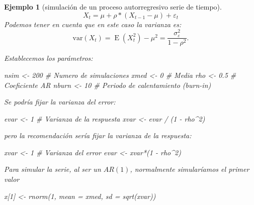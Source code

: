 \documentclass[
]{book}
\newenvironment{Shaded}{\begin{snugshade}}{\end{snugshade}}
\newcommand{\AttributeTok}[1]{\textcolor[rgb]{0.77,0.63,0.00}{#1}}
\newcommand{\CommentTok}[1]{\textcolor[rgb]{0.56,0.35,0.01}{\textit{#1}}}
\newcommand{\DecValTok}[1]{\textcolor[rgb]{0.00,0.00,0.81}{#1}}
\newcommand{\FloatTok}[1]{\textcolor[rgb]{0.00,0.00,0.81}{#1}}
\newcommand{\FunctionTok}[1]{\textcolor[rgb]{0.00,0.00,0.00}{#1}}
\newcommand{\NormalTok}[1]{#1}
\newcommand{\OtherTok}[1]{\textcolor[rgb]{0.56,0.35,0.01}{#1}}
\newcommand{\SpecialCharTok}[1]{\textcolor[rgb]{0.00,0.00,0.00}{#1}}
\theoremstyle{break}
\newtheorem{example}{Ejemplo}[chapter]
\theoremstyle{nonumberplain}
\begin{document}
\begin{example}[simulación de un proceso autorregresivo serie de tiempo]

\[X_t = \mu + \rho * (X_{t-1} - \mu) + \varepsilon_t\]
Podemos tener en cuenta que en este caso la varianza es:
\[\textrm{var}(X_t)=\operatorname{E}(X_t^2)-\mu^2=\frac{\sigma_\varepsilon^2}{1-\rho^2}.\]

Establecemos los parámetros:

\begin{Shaded}
\begin{Highlighting}[]
\NormalTok{nsim }\OtherTok{\textless{}{-}} \DecValTok{200}   \CommentTok{\# Numero de simulaciones}
\NormalTok{xmed }\OtherTok{\textless{}{-}} \DecValTok{0}     \CommentTok{\# Media}
\NormalTok{rho }\OtherTok{\textless{}{-}} \FloatTok{0.5}    \CommentTok{\# Coeficiente AR}
\NormalTok{nburn }\OtherTok{\textless{}{-}} \DecValTok{10}   \CommentTok{\# Periodo de calentamiento (burn{-}in)}
\end{Highlighting}
\end{Shaded}

Se podría fijar la varianza del error:

\begin{Shaded}
\begin{Highlighting}[]
\NormalTok{evar }\OtherTok{\textless{}{-}} \DecValTok{1}
\CommentTok{\# Varianza de la respuesta}
\NormalTok{xvar }\OtherTok{\textless{}{-}}\NormalTok{ evar }\SpecialCharTok{/}\NormalTok{ (}\DecValTok{1} \SpecialCharTok{{-}}\NormalTok{ rho}\SpecialCharTok{\^{}}\DecValTok{2}\NormalTok{)}
\end{Highlighting}
\end{Shaded}

pero la recomendación sería fijar la varianza de la respuesta:

\begin{Shaded}
\begin{Highlighting}[]
\NormalTok{xvar }\OtherTok{\textless{}{-}} \DecValTok{1}     
\CommentTok{\# Varianza del error}
\NormalTok{evar }\OtherTok{\textless{}{-}}\NormalTok{ xvar}\SpecialCharTok{*}\NormalTok{(}\DecValTok{1} \SpecialCharTok{{-}}\NormalTok{ rho}\SpecialCharTok{\^{}}\DecValTok{2}\NormalTok{)}
\end{Highlighting}
\end{Shaded}

Para simular la serie, al ser un \(AR(1)\), normalmente simularíamos el primer valor

\begin{Shaded}
\begin{Highlighting}[]
\NormalTok{x[}\DecValTok{1}\NormalTok{] }\OtherTok{\textless{}{-}} \FunctionTok{rnorm}\NormalTok{(}\DecValTok{1}\NormalTok{, }\AttributeTok{mean =}\NormalTok{ xmed, }\AttributeTok{sd =} \FunctionTok{sqrt}\NormalTok{(xvar))}
\end{Highlighting}
\end{Shaded}


\end{example}
\end{document}
